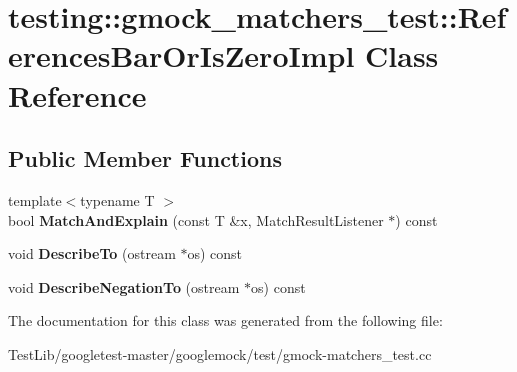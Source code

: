 \hypertarget{classtesting_1_1gmock__matchers__test_1_1ReferencesBarOrIsZeroImpl}{}\section{testing\+:\+:gmock\+\_\+matchers\+\_\+test\+:\+:References\+Bar\+Or\+Is\+Zero\+Impl Class Reference}
\label{classtesting_1_1gmock__matchers__test_1_1ReferencesBarOrIsZeroImpl}
\subsection*{Public Member Functions}
\begin{DoxyCompactItemize}
\item 
\mbox{\label{classtesting_1_1gmock__matchers__test_1_1ReferencesBarOrIsZeroImpl_ac74ff2f707bebea05a995beb77c77041}} 
{\footnotesize template$<$typename T $>$ }\\bool {\bfseries Match\+And\+Explain} (const T \&x, Match\+Result\+Listener $\ast$) const
\item 
\mbox{\label{classtesting_1_1gmock__matchers__test_1_1ReferencesBarOrIsZeroImpl_a8d8496ad72753723598efd45e6a4dcbf}} 
void {\bfseries Describe\+To} (ostream $\ast$os) const
\item 
\mbox{\label{classtesting_1_1gmock__matchers__test_1_1ReferencesBarOrIsZeroImpl_a849b65d96bf7a31b7b0e81005e466605}} 
void {\bfseries Describe\+Negation\+To} (ostream $\ast$os) const
\end{DoxyCompactItemize}


The documentation for this class was generated from the following file\+:\begin{DoxyCompactItemize}
\item 
Test\+Lib/googletest-\/master/googlemock/test/gmock-\/matchers\+\_\+test.\+cc\end{DoxyCompactItemize}
